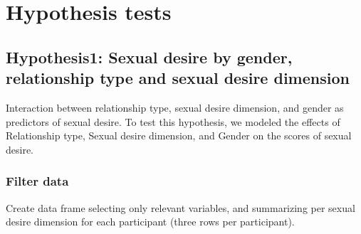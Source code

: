 \documentclass[
  bookmarksnumbered]{article}
\begin{document}
\hypertarget{hypothesis-tests}{%
\section{Hypothesis tests}\label{hypothesis-tests}}

\hypertarget{hyp1}{%
\subsection{Hypothesis1: Sexual desire by gender, relationship type and sexual desire dimension}\label{hyp1}}

Interaction between relationship type, sexual desire dimension, and gender as predictors of sexual desire. To test this hypothesis, we modeled the effects of Relationship type, Sexual desire dimension, and Gender on the scores of sexual desire.

\hypertarget{filter-data}{%
\subsubsection{Filter data}\label{filter-data}}

Create data frame selecting only relevant variables, and summarizing per sexual desire dimension for each participant (three rows per participant).
\end{document}

